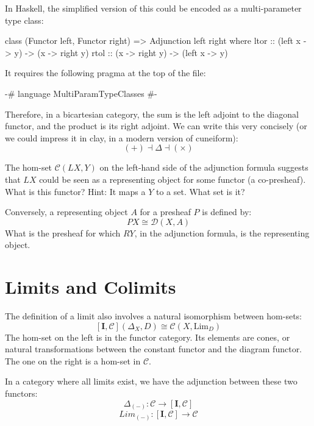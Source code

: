 \documentclass[DaoFP]{subfiles}
\begin{document}
In Haskell, the simplified version of this could be encoded as a multi-parameter type class:
\begin{haskell}
class (Functor left, Functor right) => Adjunction left right where
  ltor :: (left x -> y) -> (x -> right y)
  rtol :: (x -> right y) -> (left x -> y)
\end{haskell}
It requires the following pragma at the top of the file:
\begin{haskell}
{-# language MultiParamTypeClasses #-}
\end{haskell}



Therefore, in a bicartesian category, the sum is the left adjoint to the diagonal functor, and the product is its right adjoint. We can write this very concisely (or we could impress it in clay, in a modern version of cuneiform):
\[ (+) \dashv \Delta \dashv (\times) \]

\begin{exercise}
The hom-set $\mathcal{C} (L X, Y)$ on the left-hand side of the adjunction formula suggests that $L X$ could be seen as a representing object for some functor (a co-presheaf). What is this functor? Hint: It maps a $Y$ to a set. What set is it?
\end{exercise}

\begin{exercise}
Conversely, a representing object $A$ for a presheaf $P$ is defined by:
\[P X \cong \mathcal{D}(X, A)\]
What is the presheaf for which $R Y$, in the adjunction formula, is the representing object.
\end{exercise}

\section{Limits and Colimits}

The definition of a limit also involves a natural isomorphism between hom-sets:
\[ [\mathbf{I}, \mathcal{C}](\Delta_X, D)  \cong \mathcal{C}(X, \text{Lim}_D) \]
The hom-set on the left is in the functor category. Its elements are cones, or natural transformations between the constant functor and the diagram functor. The one on the right is a hom-set in $\mathcal{C}$. 

In a category where all limits exist, we have the adjunction between these two functors:
\[ \Delta_{(-)} \colon \mathcal{C} \to  [\mathbf{I}, \mathcal{C}] \]
\[ Lim_{(-)} \colon  [\mathbf{I}, \mathcal{C}] \to \mathcal{C} \]
\end{document}
